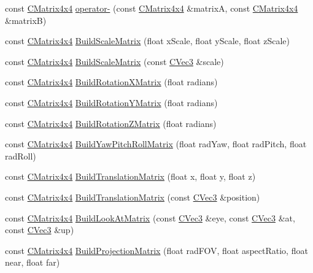 \begin{DoxyCompactItemize}
\item 
const \hyperlink{class_slim_1_1_c_matrix4x4}{C\+Matrix4x4} \hyperlink{namespace_slim_a6360fac6c239c05a53acda97ef5e1551}{operator-\/} (const \hyperlink{class_slim_1_1_c_matrix4x4}{C\+Matrix4x4} \&matrix\+A, const \hyperlink{class_slim_1_1_c_matrix4x4}{C\+Matrix4x4} \&matrix\+B)
\item 
const \hyperlink{class_slim_1_1_c_matrix4x4}{C\+Matrix4x4} \hyperlink{namespace_slim_abddee35c50669096cdf89387b29cb8cd}{Build\+Scale\+Matrix} (float x\+Scale, float y\+Scale, float z\+Scale)
\item 
const \hyperlink{class_slim_1_1_c_matrix4x4}{C\+Matrix4x4} \hyperlink{namespace_slim_a493fc3b5a9847011304b02e8197a9873}{Build\+Scale\+Matrix} (const \hyperlink{class_slim_1_1_c_vec3}{C\+Vec3} \&scale)
\item 
const \hyperlink{class_slim_1_1_c_matrix4x4}{C\+Matrix4x4} \hyperlink{namespace_slim_a884e71976d1f4bf3829820211397e4a9}{Build\+Rotation\+X\+Matrix} (float radians)
\item 
const \hyperlink{class_slim_1_1_c_matrix4x4}{C\+Matrix4x4} \hyperlink{namespace_slim_a7a905e38542f0490b2b59a4afd019860}{Build\+Rotation\+Y\+Matrix} (float radians)
\item 
const \hyperlink{class_slim_1_1_c_matrix4x4}{C\+Matrix4x4} \hyperlink{namespace_slim_ac1ebb316996683137b4c4134e885cd0c}{Build\+Rotation\+Z\+Matrix} (float radians)
\item 
const \hyperlink{class_slim_1_1_c_matrix4x4}{C\+Matrix4x4} \hyperlink{namespace_slim_af4cde3d5952efeb298dd8dcdb9d1d096}{Build\+Yaw\+Pitch\+Roll\+Matrix} (float rad\+Yaw, float rad\+Pitch, float rad\+Roll)
\item 
const \hyperlink{class_slim_1_1_c_matrix4x4}{C\+Matrix4x4} \hyperlink{namespace_slim_a77714bf2c2bb8cc7937a269282010612}{Build\+Translation\+Matrix} (float x, float y, float z)
\item 
const \hyperlink{class_slim_1_1_c_matrix4x4}{C\+Matrix4x4} \hyperlink{namespace_slim_ae6aa2fee2826666385dca2992ee6e6b9}{Build\+Translation\+Matrix} (const \hyperlink{class_slim_1_1_c_vec3}{C\+Vec3} \&position)
\item 
const \hyperlink{class_slim_1_1_c_matrix4x4}{C\+Matrix4x4} \hyperlink{namespace_slim_a84b0340b9f04235e232390e60b75256a}{Build\+Look\+At\+Matrix} (const \hyperlink{class_slim_1_1_c_vec3}{C\+Vec3} \&eye, const \hyperlink{class_slim_1_1_c_vec3}{C\+Vec3} \&at, const \hyperlink{class_slim_1_1_c_vec3}{C\+Vec3} \&up)
\item 
const \hyperlink{class_slim_1_1_c_matrix4x4}{C\+Matrix4x4} \hyperlink{namespace_slim_aeca36ffebb221046a3da3d65decf5acd}{Build\+Projection\+Matrix} (float rad\+F\+O\+V, float aspect\+Ratio, float near, float far)

\end{DoxyCompactItemize}
